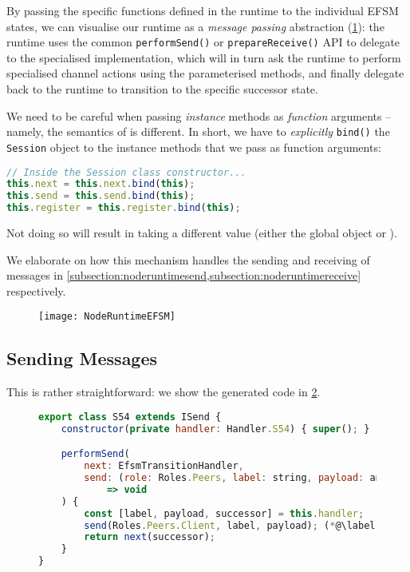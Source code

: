 By passing the specific functions defined in the runtime
to the individual EFSM states, we can visualise our runtime
as a \textit{message passing} abstraction 
(\cref{fig:noderuntimeefsm}): the runtime uses the common
\texttt{performSend()} or \texttt{prepareReceive()} API
to delegate to the specialised implementation, which will in turn
ask the runtime to perform specialised channel actions using
the parameterised methods, and finally delegate back to
the runtime to transition to the specific successor state.

\begin{remark}
We need to be careful when passing \textit{instance} methods
as \textit{function} arguments 
-- namely, the semantics of  is different.
In short, we have to \textit{explicitly}
\texttt{bind()} the \texttt{Session} object
to the instance methods that we pass as function arguments:

\begin{lstlisting}[language=javascript,tabsize=2]
// Inside the Session class constructor...
this.next = this.next.bind(this);
this.send = this.send.bind(this);
this.register = this.register.bind(this);
\end{lstlisting}

Not doing so will result in  taking
a different value 
(either the global object or ).
\end{remark}

We elaborate on how this mechanism
handles the sending and receiving of messages in
\cref{subsection:noderuntimesend,subsection:noderuntimereceive}
respectively.

\begin{figure}[!ht]
\centering
\texttt{[image: NodeRuntimeEFSM]}
\label{fig:noderuntimeefsm}
\end{figure}

\subsection{Sending Messages}
\label{subsection:noderuntimesend}

This is rather straightforward: 
we show the generated code in \cref{lst:nodesend}.

\begin{figure}[!h]
\begin{lstlisting}[language=javascript,tabsize=2]
export class S54 extends ISend {
	constructor(private handler: Handler.S54) { super(); }

	performSend(
		next: EfsmTransitionHandler,
		send: (role: Roles.Peers, label: string, payload: any[]) 
			=> void
	) {
		const [label, payload, successor] = this.handler;
		send(Roles.Peers.Client, label, payload); (*@\label{line:nodesendrole}@*)
		return next(successor);
	}
}
\end{lstlisting}
\label{lst:nodesend}
\end{figure}

